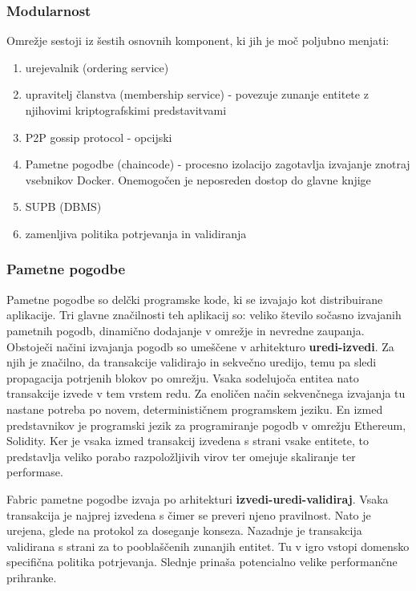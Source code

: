 \documentclass[a4paper, 12pt]{book}
\begin{document}
\subsubsection{Modularnost}
Omrežje sestoji iz šestih osnovnih komponent, ki jih je moč poljubno menjati:
\begin{enumerate}
	\item urejevalnik (ordering service)
	\item upravitelj članstva (membership service) - povezuje zunanje entitete z njihovimi kriptografskimi predstavitvami
	\item P2P gossip protocol - opcijski
	\item Pametne pogodbe (chaincode) - procesno izolacijo zagotavlja izvajanje znotraj vsebnikov Docker. 
	Onemogočen je neposreden dostop do glavne knjige
	\item SUPB (DBMS)
	\item zamenljiva politika potrjevanja in validiranja
\end{enumerate}

\subsubsection{Pametne pogodbe}
Pametne pogodbe so delčki programske kode, ki se izvajajo kot distribuirane aplikacije.
Tri glavne značilnosti teh aplikacij so: veliko število sočasno izvajanih pametnih pogodb, dinamično dodajanje v omrežje in nevredne zaupanja.
Obstoječi načini izvajanja pogodb so umeščene v arhitekturo \textbf{uredi-izvedi}.
Za njih je značilno, da transakcije validirajo in sekvečno uredijo, temu pa sledi propagacija potrjenih blokov po omrežju.
Vsaka sodelujoča entitea nato transakcije izvede v tem vrstem redu.
Za enoličen način sekvenčnega izvajanja tu nastane potreba po novem, determinističnem programskem jeziku.
En izmed predstavnikov je programski jezik za programiranje pogodb v omrežju Ethereum, Solidity.
Ker je vsaka izmed transakcij izvedena s strani vsake entitete, to predstavlja veliko porabo razpoložljivih virov ter omejuje skaliranje ter performase.

Fabric pametne pogodbe izvaja po arhitekturi \textbf{izvedi-uredi-validiraj}.
Vsaka transakcija je najprej izvedena s čimer se preveri njeno pravilnost.
Nato je urejena, glede na protokol za doseganje konseza.
Nazadnje je transakcija validirana s strani za to pooblaščenih zunanjih entitet.
Tu v igro vstopi domensko specifična politika potrjevanja.
Slednje prinaša potencialno velike performančne prihranke.
\end{document}
